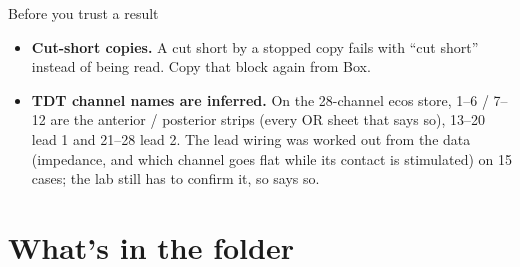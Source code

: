 \begin{careful}{Before you trust a result}
\begin{itemize}[topsep=0pt]
  \item \textbf{Cut-short copies.} A  cut short by a stopped copy fails with ``cut short'' instead of being read. Copy that block again from Box.
  \item \textbf{TDT channel names are inferred.} On the 28-channel ecos store, 1--6 / 7--12 are the anterior / posterior strips (every OR sheet that says so), 13--20 lead 1 and 21--28 lead 2. The lead wiring was worked out from the data (impedance, and which channel goes flat while its contact is stimulated) on 15 cases; the lab still has to confirm it, so  says so.
\end{itemize}
\end{careful}

\section{What's in the folder}

